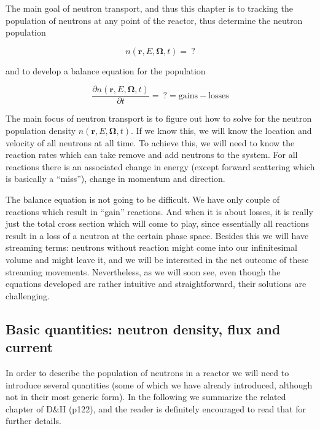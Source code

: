 The main goal of neutron transport, and thus this chapter is to tracking the population of neutrons at any point of the reactor, thus determine the neutron population

\begin{equation}
n(\mathbf{r}, E, \mathbf{\Omega},t) = \:?
\end{equation}

\noindent and to develop a balance equation for the population

\begin{equation}
\frac{\partial n(\mathbf{r}, E, \mathbf{\Omega},t)}{\partial t} = \:? = \text{gains} - \text{losses}
\end{equation}

The main focus of neutron transport is to figure out how to solve for the neutron population density $n(\mathbf{r}, E, \mathbf{\Omega},t)$. If we know this, we will know the location and velocity of all neutrons at all time. To achieve this, we will need to know the reaction rates which can take remove and add neutrons to the system. For all reactions there is an associated change in energy (except forward scattering which is basically a ``miss''), change in momentum and direction.

The balance equation is not going to be difficult. We have only couple of reactions which result in ``gain'' reactions. And when it is about losses, it is really just the total cross section which will come to play, since essentially all reactions result in a loss of a neutron at the certain phase space. Besides this we will have streaming terms: neutrons without reaction might come into our infinitesimal volume and might leave it, and we will be interested in the net outcome of these streaming movements. Nevertheless, as we will soon see, even though the equations developed are rather intuitive and straightforward, their solutions are challenging.

\subsection{Basic quantities: neutron density, flux and current}

In order to describe the population of neutrons in a reactor we will need to introduce several quantities (some of which we have already introduced, although not in their most generic form). In the following we summarize the related chapter of D\&H (p122), and the reader is definitely encouraged to read that for further details.

